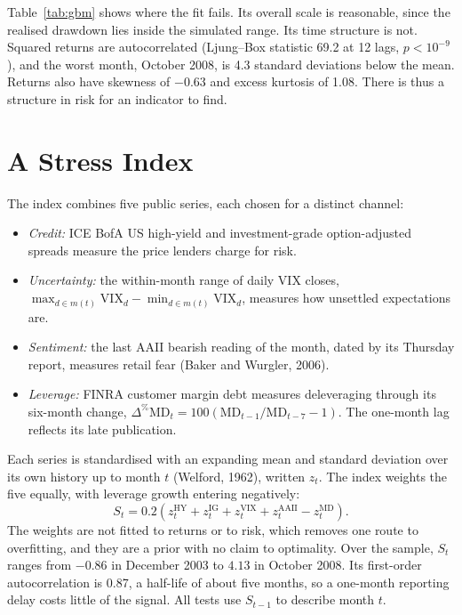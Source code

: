 \documentclass[10pt,twocolumn,letterpaper]{article}
\begin{document}
Table~\ref{tab:gbm} shows where the fit fails. Its overall scale is reasonable, since the realised drawdown lies inside the simulated range. Its time structure is not. Squared returns are autocorrelated (Ljung--Box statistic 69.2 at 12 lags, $p < 10^{-9}$), and the worst month, October 2008, is 4.3 standard deviations below the mean. Returns also have skewness of $-0.63$ and excess kurtosis of 1.08. There is thus a structure in risk for an indicator to find.

\section{A Stress Index}

The index combines five public series, each chosen for a distinct channel:
\begin{itemize}
\item \textit{Credit:} ICE BofA US high-yield and investment-grade option-adjusted spreads measure the price lenders charge for risk.
\item \textit{Uncertainty:} the within-month range of daily VIX closes, $\max_{d \in m(t)}\mathrm{VIX}_d - \min_{d \in m(t)}\mathrm{VIX}_d$, measures how unsettled expectations are.
\item \textit{Sentiment:} the last AAII bearish reading of the month, dated by its Thursday report, measures retail fear (Baker and Wurgler, 2006).
\item \textit{Leverage:} FINRA customer margin debt measures deleveraging through its six-month change, $\Delta^{\%}\mathrm{MD}_t = 100(\mathrm{MD}_{t-1}/\mathrm{MD}_{t-7} - 1)$. The one-month lag reflects its late publication.
\end{itemize}
Each series is standardised with an expanding mean and standard deviation over its own history up to month $t$ (Welford, 1962), written $z_t$. The index weights the five equally, with leverage growth entering negatively:
\begin{equation}
S_t = 0.2\left(z_t^{\text{HY}} + z_t^{\text{IG}} + z_t^{\text{VIX}} + z_t^{\text{AAII}} - z_t^{\text{MD}}\right). \label{eq:stress}
\end{equation}
The weights are not fitted to returns or to risk, which removes one route to overfitting, and they are a prior with no claim to optimality. Over the sample, $S_t$ ranges from $-0.86$ in December 2003 to $4.13$ in October 2008. Its first-order autocorrelation is 0.87, a half-life of about five months, so a one-month reporting delay costs little of the signal. All tests use $S_{t-1}$ to describe month $t$.
\end{document}
